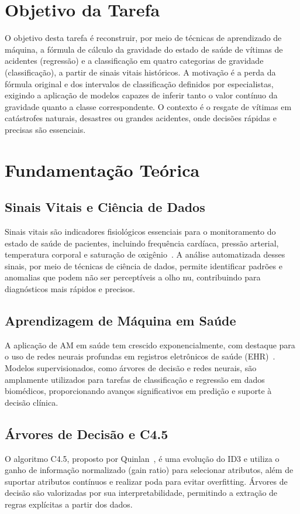 \documentclass[11pt]{article}
\begin{document}
\section{Objetivo da Tarefa}
O objetivo desta tarefa é reconstruir, por meio de técnicas de aprendizado de máquina, a fórmula de cálculo da gravidade do estado de saúde de vítimas de acidentes (regressão) e a classificação em quatro categorias de gravidade (classificação), a partir de sinais vitais históricos. A motivação é a perda da fórmula original e dos intervalos de classificação definidos por especialistas, exigindo a aplicação de modelos capazes de inferir tanto o valor contínuo da gravidade quanto a classe correspondente. O contexto é o resgate de vítimas em catástrofes naturais, desastres ou grandes acidentes, onde decisões rápidas e precisas são essenciais.

\section{Fundamentação Teórica}
\subsection{Sinais Vitais e Ciência de Dados}
Sinais vitais são indicadores fisiológicos essenciais para o monitoramento do estado de saúde de pacientes, incluindo frequência cardíaca, pressão arterial, temperatura corporal e saturação de oxigênio~\cite{clifford2012advanced}. A análise automatizada desses sinais, por meio de técnicas de ciência de dados, permite identificar padrões e anomalias que podem não ser perceptíveis a olho nu, contribuindo para diagnósticos mais rápidos e precisos.

\subsection{Aprendizagem de Máquina em Saúde}
A aplicação de AM em saúde tem crescido exponencialmente, com destaque para o uso de redes neurais profundas em registros eletrônicos de saúde (EHR)~\cite{shickel2017deep}. Modelos supervisionados, como árvores de decisão e redes neurais, são amplamente utilizados para tarefas de classificação e regressão em dados biomédicos, proporcionando avanços significativos em predição e suporte à decisão clínica.

\subsection{Árvores de Decisão e C4.5}
O algoritmo C4.5, proposto por Quinlan~\cite{quinlan1993c4.5}, é uma evolução do ID3 e utiliza o ganho de informação normalizado (gain ratio) para selecionar atributos, além de suportar atributos contínuos e realizar poda para evitar overfitting. Árvores de decisão são valorizadas por sua interpretabilidade, permitindo a extração de regras explícitas a partir dos dados.
\end{document}
